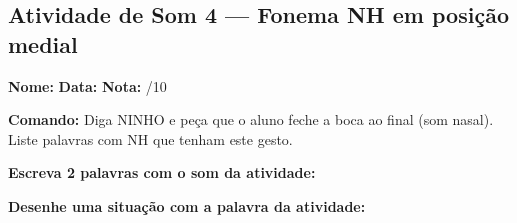 \subsection{Atividade de Som 4 --- Fonema NH em posição medial}
\begin{exercicio}



\noindent\textbf{Nome:} \underline{\hspace{3.2cm}} \quad \textbf{Data:} \underline{\hspace{1.6cm}} \quad \textbf{Nota:} \underline{\hspace{0.9cm}}/10


\noindent\textbf{Comando:} Diga NINHO e peça que o aluno feche a boca ao final (som nasal). Liste palavras com NH que tenham este gesto.


\begin{center}
\end{center}

\noindent\textbf{Escreva 2 palavras com o som da atividade:}

\begin{center}
  \underline{\hspace{3cm}} \quad \underline{\hspace{3cm}}
\end{center}

\noindent\textbf{Desenhe uma situação com a palavra da atividade:}

\begin{center}
\end{center}

\end{exercicio}



